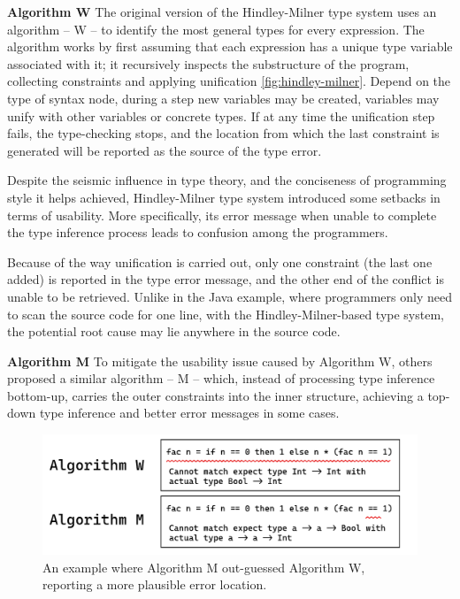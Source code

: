\textbf{Algorithm W} The original version of the Hindley-Milner type system uses an algorithm -- W -- to identify the most general types for every expression. The algorithm works by first assuming that each expression has a unique type variable associated with it; it recursively inspects the substructure of the program, collecting constraints and applying unification \ref{fig:hindley-milner}. Depend on the type of syntax node, during a step new variables may be created, variables may unify with other variables or concrete types. If at any time the unification step fails, the type-checking stops, and the location from which the last constraint is generated will be reported as the source of the type error.



Despite the seismic influence in type theory, and the conciseness of programming style it helps achieved,  Hindley-Milner type system introduced some setbacks in terms of usability. More specifically, its error message when unable to complete the type inference process leads to confusion among the programmers. 

Because of the way unification is carried out, only one constraint (the last one added) is reported in the type error message, and the other end of the conflict is unable to be retrieved. Unlike in the Java example, where programmers only need to scan the source code for one line, with the Hindley-Milner-based type system, the potential root cause may lie anywhere in the source code.

\textbf{Algorithm M} 
To mitigate the usability issue caused by Algorithm W, others proposed a similar algorithm -- M \cite{Lee1998-fx} -- which, instead of processing type inference bottom-up, carries the outer constraints into the inner structure, achieving a top-down type inference and better error messages in some cases. 

\begin{figure}[hbt]
  \includegraphics[width=0.8\linewidth]{AlgorithmWM1.pdf}
  \caption{
    \label{fig:algorithm-m-1}
      An example where Algorithm M out-guessed Algorithm W, reporting a more plausible error location.}
\end{figure}


